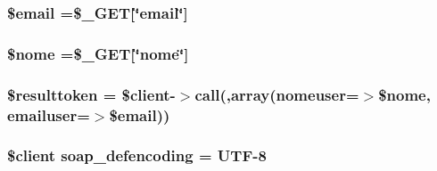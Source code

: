 \subsubsection[{\$email}]{\setlength{\rightskip}{0pt plus 5cm}\$email =\$\+\_\+\+G\+E\+T\mbox{[}\char`\"{}email\char`\"{}\mbox{]}}\label{_regista_user_8php_ad634f418b20382e2802f80532d76d3cd}
\hypertarget{_regista_user_8php_ac8c9d9dd5d90fa5854f0cb8397084ebd}{}
\subsubsection[{\$nome}]{\setlength{\rightskip}{0pt plus 5cm}\$nome =\$\+\_\+\+G\+E\+T\mbox{[}\char`\"{}nome\char`\"{}\mbox{]}}\label{_regista_user_8php_ac8c9d9dd5d90fa5854f0cb8397084ebd}
\hypertarget{_regista_user_8php_af03fe45fe254e6434fe3819dfa8c4b34}{}
\subsubsection[{\$resulttoken}]{\setlength{\rightskip}{0pt plus 5cm}\$resulttoken = \$client-\/$>$call(\textquotesingle{},array(\textquotesingle{}nomeuser\textquotesingle{}=$>$\$nome, \textquotesingle{}emailuser\textquotesingle{}=$>$\$email))}\label{_regista_user_8php_af03fe45fe254e6434fe3819dfa8c4b34}
\hypertarget{_regista_user_8php_a944cce1b9c1aa5e93c77ace20ce99989}{}
\subsubsection[{soap\+\_\+defencoding}]{\setlength{\rightskip}{0pt plus 5cm}\$client soap\+\_\+defencoding = \textquotesingle{}U\+T\+F-\/8\textquotesingle{}}\label{_regista_user_8php_a944cce1b9c1aa5e93c77ace20ce99989}
